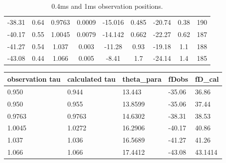 \documentclass{emulateapj}
\begin{document}
\begin{table}
\begin{tabular}{|c|c|c|c|c|c|c|c|c|}
-38.31                           & 0.64                               & 0.9763              & 0.0009                             & -15.016  & 0.485                                    & -20.74   & 0.38  &190                                    \\

-40.17                           & 0.55                               & 1.0045              & 0.0079                             & -14.142  & 0.662                                    & -22.27   & 0.62  &187                                   \\

-41.27                           & 0.54                               & 1.037              & 0.003                              & -11.28  & 0.93                                     & -19.18   & 1.1   &188                                   \\

-43.08                           & 0.44                               & 1.066              & 0.005                              & -8.41   & 1.7                                      & -24.14   & 1.4   &185   
                                  
\end{tabular}
\label{table:apex}
\caption{0.4ms and 1ms observation positions.}
\end{table}

\begin{table}
\begin{tabular}{|l|l|l|l|l|}
\hline
observation tau & calculated tau & theta\_para & fDobs        & fD\_cal \\ \hline
0.950          & 0.944       & 13.443      & -35.06 & 36.86 \\ \hline
0.950          & 0.955         & 13.8599    & -35.06 & 37.44 \\ \hline
0.9763    & 0.9763       & 14.6302  & -38.31 & 38.53 \\ \hline
1.0045          & 1.0272        & 16.2906 & -40.17 & 40.86 \\ \hline
1.037           & 1.036        & 16.5689 & -41.27 & 41.26 \\ \hline
1.066     & 1.066         & 17.4412 & -43.08 & 43.1414 \\ \hline
\end{tabular}
\end{table}
\end{document}
